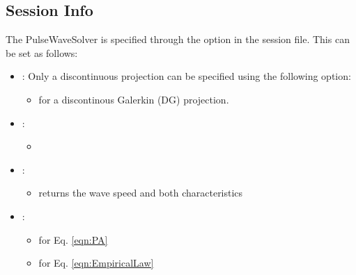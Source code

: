 \subsection{Session Info}
The PulseWaveSolver is specified through the 
option in the session file. This can be set as follows:
\begin{itemize}
\item {}: Only a discontinuous projection can be specified
using the following option:
    \begin{itemize}
    \item {} for a discontinous Galerkin (DG) projection.
    \end{itemize}
\item {}:
    \begin{itemize}
    \item {}
    \end{itemize}
\item {}:
    \begin{itemize}
    \item {} returns the wave speed and both characteristics
    \end{itemize}
\item {}:
    \begin{itemize}
    \item {} for Eq. \eqref{eqn:PA}
    \item {} for Eq. \eqref{eqn:EmpiricalLaw}
    \end{itemize}
\end{itemize}

